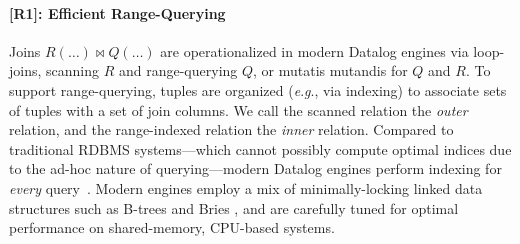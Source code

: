 \documentclass[nonacm,sigplan]{acmart}
\begin{document}

\paragraph*{[R1]: Efficient Range-Querying} Joins $R(\ldots) \bowtie Q(\ldots)$ are  operationalized in modern Datalog engines via loop-joins, scanning $R$ and range-querying $Q$, or mutatis mutandis for $Q$ and $R$. 
To support range-querying, tuples are organized (\emph{e}.\emph{g}., via indexing) to associate sets of tuples with a set of join columns. We call the scanned relation the \emph{outer} relation, and the range-indexed relation the \emph{inner} relation. Compared to traditional RDBMS systems---which cannot possibly compute optimal indices due to the ad-hoc nature of querying---modern Datalog engines perform indexing for \emph{every} query~\cite{indexselection}.
Modern engines employ a mix of minimally-locking linked data structures such as B-trees and Bries \cite{jordan2019specialized,jordan2019brie,byods}, and are carefully tuned for optimal performance on shared-memory, CPU-based systems.
\end{document}
